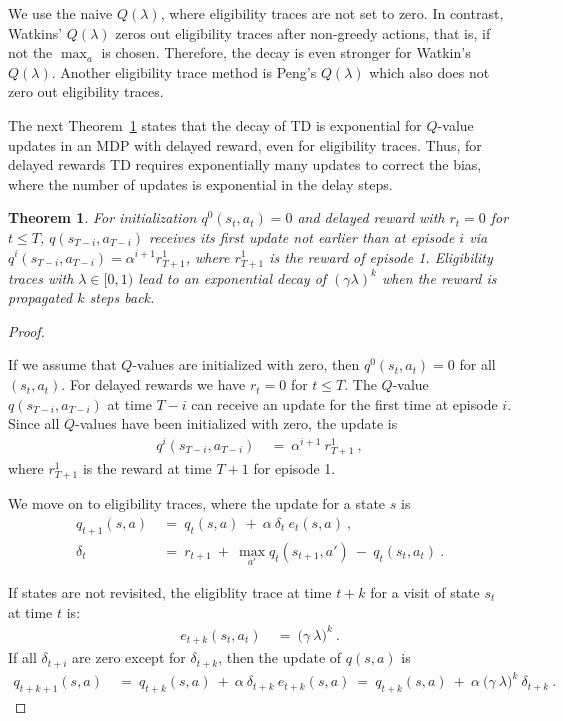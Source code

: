 \documentclass{article}
\newtheorem{theoremA}{Theorem}
\renewcommand{\leq}{\leqslant}
\begin{document}
\begin{appendices}
We use the naive $Q(\lambda)$, where eligibility traces are not set to
zero.
In contrast, Watkins' $Q(\lambda)$ \cite{Watkins:89}
zeros out eligibility traces
after non-greedy actions, that is, if not the $\max_a$ is chosen.
Therefore, the decay is even stronger for  Watkin's $Q(\lambda)$.
Another eligibility trace method is Peng's $Q(\lambda)$ \cite{Peng:96}
which also does not zero out eligibility traces.


The next Theorem~\ref{th:AexponDecay} 
states that the decay of TD is exponential for
$Q$-value updates in an MDP with delayed reward, even for eligibility traces.
Thus, for delayed rewards TD requires exponentially many updates to correct the bias, 
where the number of updates is exponential in the delay steps.  
\begin{theoremA}
\label{th:AexponDecay}
For initialization  $q^0(s_t,a_t)=0$ and
delayed reward with $r_t=0$ for $t \leq T$, 
$q(s_{T-i},a_{T-i})$ receives its 
first update not earlier than at episode $i$ via
$q^i(s_{T-i},a_{T-i}) =  \alpha^{i+1} r_{T+1}^1$,
where $r_{T+1}^1$ is the reward of episode 1.
Eligibility traces with $\lambda \in [0,1)$ 
lead to an exponential decay of $(\gamma \lambda)^k$ when the reward
is propagated $k$ steps back.
\end{theoremA}


\begin{proof}
\label{proof:ATD}

If we assume that $Q$-values are initialized with zero, then
$q^0(s_t,a_t)=0$ for all $(s_t,a_t)$.
For delayed rewards we have $r_t=0$ for $t \leq T$.
The $Q$-value  $q(s_{T-i},a_{T-i})$ at time $T-i$ can receive an
update for the first time at episode $i$. Since all $Q$-values have
been initialized with zero, the update is
\begin{align}
  q^i(s_{T-i},a_{T-i}) \ &= \ \alpha^{i+1} \ r_{T+1}^1 \ ,
\end{align} 
where $r_{T+1}^1$ is the reward at time $T+1$ for episode 1.

We move on to eligibility traces, where the
update for a state $s$ is
\begin{align}
 q_{t+1}(s,a) \ &= \ q_t(s,a) \ + \
 \alpha \ \delta_t \  e_t(s,a) \ , \\
\delta_t  \ &= \ r_{t+1} \ + \ \max_{a'} q_t(s_{t+1},a') \ - \
  q_t(s_t,a_t) \ .
\end{align} 

If states are not revisited,
the eligiblity trace at time $t+k$ for a visit of state $s_t$ at time $t$ is:
\begin{align}
  e_{t+k}(s_t,a_t) \ &= \  \big(\gamma \ \lambda \big)^k \ .
\end{align} 
If all $\delta_{t+i}$ are zero except for $\delta_{t+k}$,
then the update of $q(s,a)$ is
\begin{align}
 q_{t+k+1}(s,a) \ &= \ q_{t+k}(s,a) \ + \
 \alpha \ \delta_{t+k} \  e_{t+k}(s,a) \ = \
 q_{t+k}(s,a) \ + \
 \alpha \  \big(\gamma \ \lambda \big)^k \ \delta_{t+k} \ .
\end{align} 
\end{proof}


\end{appendices}
\end{document}
